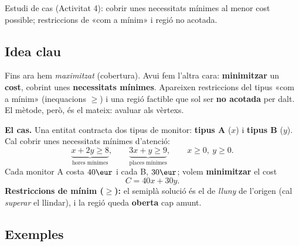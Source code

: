 %
{Estudi de cas (Activitat 4): cobrir unes necessitats mínimes al menor cost possible; restriccions de «com a mínim» i regió no acotada.}

\subsection{Idea clau}

Fins ara hem \emph{maximitzat} (cobertura). Avui fem l'altra cara: \textbf{minimitzar}
un \textbf{cost}, cobrint unes \textbf{necessitats mínimes}. Apareixen restriccions
del tipus «com a mínim» (inequacions $\ge$) i una regió factible que sol ser
\textbf{no acotada} per dalt. El mètode, però, és el mateix: avaluar als vèrtexs.

\begin{idea}
\textbf{El cas.} Una entitat contracta dos tipus de monitor: \textbf{tipus A} ($x$) i
\textbf{tipus B} ($y$). Cal cobrir unes necessitats mínimes d'atenció:
\[
\underbrace{x+2y\ge 8}_{\text{hores mínimes}},\qquad
\underbrace{3x+y\ge 9}_{\text{places mínimes}},\qquad x\ge 0,\ y\ge 0.
\]
Cada monitor A costa $40\eur$ i cada B, $30\eur$; volem \textbf{minimitzar} el cost
\[
C=40x+30y.
\]
\textbf{Restriccions de mínim ($\ge$):} el semiplà solució és el de \emph{lluny} de
l'origen (cal \emph{superar} el llindar), i la regió queda \textbf{oberta} cap amunt.
\end{idea}

\subsection{Exemples}

